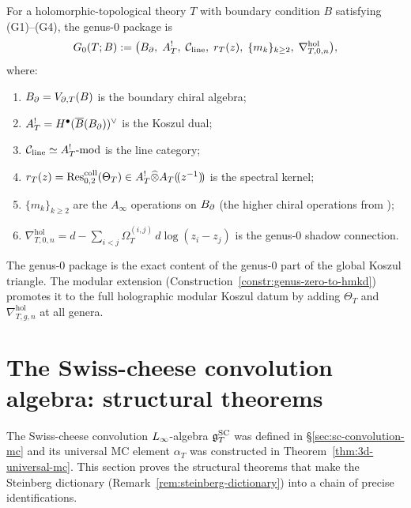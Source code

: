 \begin{definition}
For a holomorphic-topological theory $T$ with boundary
condition $B$ satisfying (G1)--(G4), the genus-$0$ package is
\begin{equation}%
G_0(T;B)
:= \bigl(
\Bbound,\;
A^!_T,\;
\cC_{\mathrm{line}},\;
r_T(z),\;
\{m_k\}_{k\ge 2},\;
\nabla^{\mathrm{hol}}_{T,0,n}
\bigr),
\end{equation}
where:
\begin{enumerate}[label=(\roman*),leftmargin=1.8em]
\item $B_{\partial}=V_{\partial,T}(B)$ is the boundary chiral algebra;
\item $A^!_T=H^\bullet(\overline{B}(B_{\partial}))^\vee$ is the Koszul dual;
\item $\mathcal C_{\mathrm{line}}\simeq A^!_T\text{-mod}$ is the line
category;
\item $r_T(z)=\operatorname{Res}^{\mathrm{coll}}_{0,2}(\Theta_T)
\in A^!_T\widehat{\otimes} A_T(\!(z^{-1})\!)$ is the spectral kernel;
\item $\{m_k\}_{k\ge 2}$ are the $A_\infty$ operations on
$B_{\partial}$ (the higher chiral operations from \cite{GKW25});
\item $\nabla^{\mathrm{hol}}_{T,0,n}
= d - \sum_{i<j}\Omega_T^{(i,j)}\,d\log(z_i-z_j)$
is the genus-$0$ shadow connection.
\end{enumerate}
The genus-$0$ package is the exact content of the genus-$0$
part of the global Koszul triangle. The modular extension
(Construction~\ref{constr:genus-zero-to-hmkd}) promotes it to
the full holographic modular Koszul datum by adding
$\Theta_T$ and $\nabla^{\mathrm{hol}}_{T,g,n}$ at all genera.
\end{definition}




\section{The Swiss-cheese convolution algebra: structural theorems}

The Swiss-cheese convolution $L_\infty$-algebra $\mathfrak{g}^{\mathrm{SC}}_T$ was
defined in \S\ref{sec:sc-convolution-mc} and its universal MC
element $\alpha_T$ was constructed in
Theorem~\ref{thm:3d-universal-mc}. This section proves the
structural theorems that make the Steinberg dictionary
(Remark~\ref{rem:steinberg-dictionary}) into a chain of precise
identifications.

